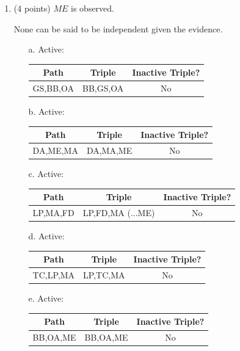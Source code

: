 \documentclass[12pt]{article}
\begin{document}
\begin{enumerate}
	\item (4 points) $ME$ is observed.

	None can be said to be independent given the evidence.

	\begin{enumerate}
		\item[a.]
		Active:
		\begin{center}
			\begin{tabular}{|c|c|c|}
				\hline
				Path & Triple & Inactive Triple? \\
				\hline
				GS,BB,OA & BB,GS,OA & No \\
				\hline
			\end{tabular}
		\end{center}

		\item[b.]
		Active:
		\begin{center}
			\begin{tabular}{|c|c|c|}
				\hline
				Path & Triple & Inactive Triple? \\
				\hline
				DA,ME,MA & DA,MA,ME & No \\
				\hline
			\end{tabular}
		\end{center}

		\item[c.]
		Active:
		\begin{center}
			\begin{tabular}{|c|c|c|}
				\hline
				Path & Triple & Inactive Triple? \\
				\hline
				LP,MA,FD & LP,FD,MA (...ME) & No \\
				\hline
			\end{tabular}
		\end{center}

		\item[d.]
		Active:
		\begin{center}
			\begin{tabular}{|c|c|c|}
				\hline
				Path & Triple & Inactive Triple? \\
				\hline
				TC,LP,MA & LP,TC,MA & No \\
				\hline
			\end{tabular}
		\end{center}

		\item[e.]
		Active:
		\begin{center}
			\begin{tabular}{|c|c|c|}
				\hline
				Path & Triple & Inactive Triple? \\
				\hline
				BB,OA,ME & BB,OA,ME & No \\
				\hline
			\end{tabular}
		\end{center}

	\end{enumerate}

\end{enumerate}
\end{document}
